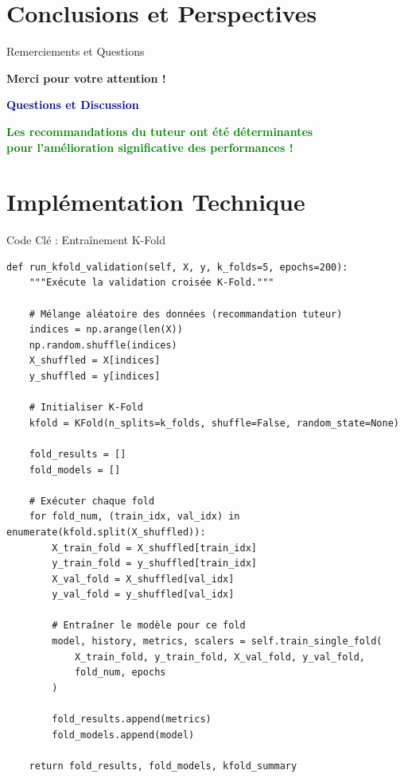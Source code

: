 \documentclass[aspectratio=169]{beamer}
\begin{document}
\section{Conclusions et Perspectives}
\begin{frame}{Remerciements et Questions}
    \begin{center}
        \Large
        \textbf{Merci pour votre attention !}

        \vspace{1cm}

        \textcolor{darkblue}{\textbf{Questions et Discussion}}

        \vspace{1cm}

        
        

        \vspace{0.5cm}

        \textcolor{green}{\textbf{Les recommandations du tuteur ont été déterminantes}} \\
        \textcolor{green}{\textbf{pour l'amélioration significative des performances !}}
    \end{center}
\end{frame}

\section{Implémentation Technique}

\begin{frame}[fragile]{Code Clé : Entraînement K-Fold}
    \begin{lstlisting}[caption=Boucle d'entraînement K-Fold principale]
def run_kfold_validation(self, X, y, k_folds=5, epochs=200):
    """Exécute la validation croisée K-Fold."""

    # Mélange aléatoire des données (recommandation tuteur)
    indices = np.arange(len(X))
    np.random.shuffle(indices)
    X_shuffled = X[indices]
    y_shuffled = y[indices]

    # Initialiser K-Fold
    kfold = KFold(n_splits=k_folds, shuffle=False, random_state=None)

    fold_results = []
    fold_models = []

    # Exécuter chaque fold
    for fold_num, (train_idx, val_idx) in enumerate(kfold.split(X_shuffled)):
        X_train_fold = X_shuffled[train_idx]
        y_train_fold = y_shuffled[train_idx]
        X_val_fold = X_shuffled[val_idx]
        y_val_fold = y_shuffled[val_idx]

        # Entraîner le modèle pour ce fold
        model, history, metrics, scalers = self.train_single_fold(
            X_train_fold, y_train_fold, X_val_fold, y_val_fold,
            fold_num, epochs
        )

        fold_results.append(metrics)
        fold_models.append(model)

    return fold_results, fold_models, kfold_summary
    \end{lstlisting}
\end{frame}
\end{document}
